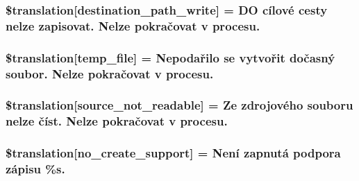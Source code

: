 \subsubsection[{\$translation}]{\setlength{\rightskip}{0pt plus 5cm}\$translation\mbox{[}\textquotesingle{}destination\+\_\+path\+\_\+write\textquotesingle{}\mbox{]} = \textquotesingle{}D\+O cílové cesty nelze zapisovat. Nelze pokračovat v procesu.\textquotesingle{}}\label{class_8upload_8cs___c_s_8php_a40e4e1962226b89fd76da5819a9602b0}
\hypertarget{class_8upload_8cs___c_s_8php_a2baece8da11e20d45175db91851ec3e3}{}
\subsubsection[{\$translation}]{\setlength{\rightskip}{0pt plus 5cm}\$translation\mbox{[}\textquotesingle{}temp\+\_\+file\textquotesingle{}\mbox{]} = \textquotesingle{}Nepodařilo se vytvořit dočasný soubor. Nelze pokračovat v procesu.\textquotesingle{}}\label{class_8upload_8cs___c_s_8php_a2baece8da11e20d45175db91851ec3e3}
\hypertarget{class_8upload_8cs___c_s_8php_a922967ca2df0efdd455261142d8e5715}{}
\subsubsection[{\$translation}]{\setlength{\rightskip}{0pt plus 5cm}\$translation\mbox{[}\textquotesingle{}source\+\_\+not\+\_\+readable\textquotesingle{}\mbox{]} = \textquotesingle{}Ze zdrojového souboru nelze číst. Nelze pokračovat v procesu.\textquotesingle{}}\label{class_8upload_8cs___c_s_8php_a922967ca2df0efdd455261142d8e5715}
\hypertarget{class_8upload_8cs___c_s_8php_a346dfd1ade29f583dd20d345c436859f}{}
\subsubsection[{\$translation}]{\setlength{\rightskip}{0pt plus 5cm}\$translation\mbox{[}\textquotesingle{}no\+\_\+create\+\_\+support\textquotesingle{}\mbox{]} = \textquotesingle{}Není zapnutá podpora zápisu \%s.\textquotesingle{}}\label{class_8upload_8cs___c_s_8php_a346dfd1ade29f583dd20d345c436859f}
\hypertarget{class_8upload_8cs___c_s_8php_a53013ce9255c4e1849098ddd9fdb2b3f}{}
